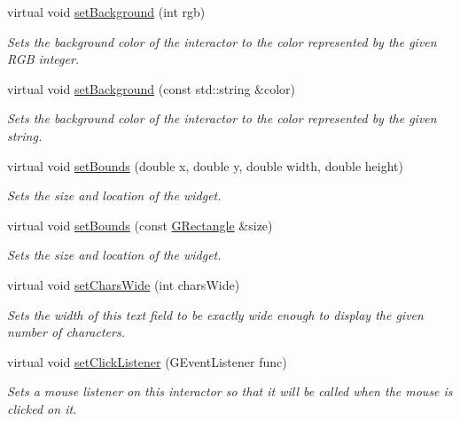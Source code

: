 \begin{DoxyCompactItemize}
virtual void \mbox{\hyperlink{classGInteractor_acba7e546c2025c0a15ca4b4cc92043db}{set\+Background}} (int rgb)
\begin{DoxyCompactList}\small\item\em Sets the background color of the interactor to the color represented by the given R\+GB integer. \end{DoxyCompactList}\item 
virtual void \mbox{\hyperlink{classGInteractor_ab4677ab2474e68b07aa56605af92a84a}{set\+Background}} (const std\+::string \&color)
\begin{DoxyCompactList}\small\item\em Sets the background color of the interactor to the color represented by the given string. \end{DoxyCompactList}\item 
virtual void \mbox{\hyperlink{classGInteractor_a2aae8197624b72265ab83b4f1bc73f2f}{set\+Bounds}} (double x, double y, double width, double height)
\begin{DoxyCompactList}\small\item\em Sets the size and location of the widget. \end{DoxyCompactList}\item 
virtual void \mbox{\hyperlink{classGInteractor_acada386653f008cacc7cce86426bef7c}{set\+Bounds}} (const \mbox{\hyperlink{structGRectangle}{G\+Rectangle}} \&size)
\begin{DoxyCompactList}\small\item\em Sets the size and location of the widget. \end{DoxyCompactList}\item 
virtual void \mbox{\hyperlink{classGTextField_aef8026e0b00b17dbccfc456e75308f16}{set\+Chars\+Wide}} (int chars\+Wide)
\begin{DoxyCompactList}\small\item\em Sets the width of this text field to be exactly wide enough to display the given number of characters. \end{DoxyCompactList}\item 
virtual void \mbox{\hyperlink{classGInteractor_abd40af6921242584d0954f173911b190}{set\+Click\+Listener}} (G\+Event\+Listener func)
\begin{DoxyCompactList}\small\item\em Sets a mouse listener on this interactor so that it will be called when the mouse is clicked on it. \end{DoxyCompactList}\item 

\end{DoxyCompactItemize}
